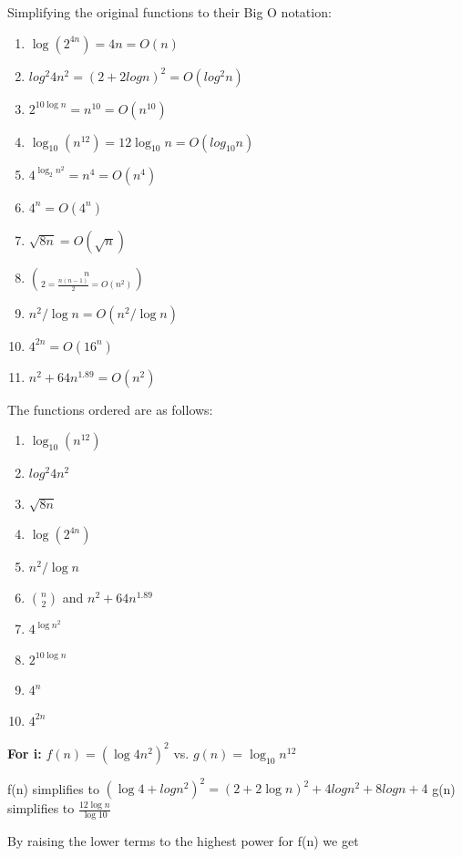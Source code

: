 \documentclass[11pt,largemargins]{homework}
\begin{document}
\begin{alphaparts}
  \questionpart

  Simplifying the original functions to their Big O notation:
  \begin{enumerate}[label=(\roman*)]
    \item $\log(2^{4n}) = 4n = O(n)$
    \item $log^2 4n^2 = (2 + 2 log n)^2 = O(log^2 n)$
    \item $2^{10 \log n} = n^{10} = O(n^{10})$
    \item $\log_{10}(n^{12}) = 12 \log_10 n = O(log_{10} n)$
    \item $4^{\log_2 n^2} = n^4 = O(n^4)$
    \item $4^n = O(4^n)$
    \item $\sqrt{8n} = O(\sqrt{n})$
    \item ${n}\choose{2} = \frac{n(n-1)}{2} = O(n^2)$
    \item $n^2 / \log n = O(n^2 / \log n)$
    \item $4^{2n} = O(16^{n})$
    \item $n^2 + 64n^{1.89} = O(n^2)$
  \end{enumerate}

  The functions ordered are as follows:
  \begin{enumerate}[label=(\roman*)]
    \item $\log_{10}(n^{12})$
    \item $log^2 4n^2$
    \item $\sqrt{8n}$
    \item $\log(2^{4n})$
    \item $n^2 / \log n$
    \item ${n}\choose{2}$ and $n^2 + 64n^{1.89}$
    \item $4^{\log n^2}$
    \item $2^{10 \log n}$
    \item $4^n$
    \item $4^{2n}$
  \end{enumerate}

  \newpage
  \questionpart

  \textbf{For i:} $f(n) = (\log 4n^2)^2$ vs. $g(n) = \log_{10} n^{12}$

  f(n) simplifies to $(\log 4 + log n^2)^2 = (2 + 2 \log n)^2 + 4 log n^2 + 8 log n + 4$
  g(n) simplifies to $\frac{12 \log n}{\log 10}$

  By raising the lower terms to the highest power for f(n) we get


\end{alphaparts}
\end{document}
